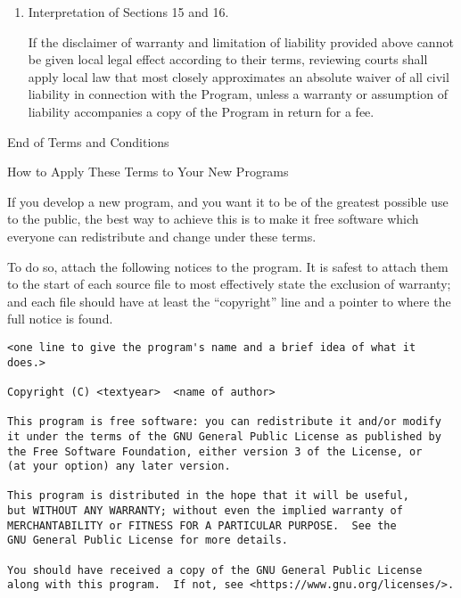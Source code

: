 \begin{enumerate}
        IN NO EVENT UNLESS REQUIRED BY APPLICABLE LAW OR AGREED TO IN
        WRITING WILL ANY COPYRIGHT HOLDER, OR ANY OTHER PARTY WHO MODIFIES
        AND/OR CONVEYS THE PROGRAM AS PERMITTED ABOVE, BE LIABLE TO YOU FOR
        DAMAGES, INCLUDING ANY GENERAL, SPECIAL, INCIDENTAL OR CONSEQUENTIAL
        DAMAGES ARISING OUT OF THE USE OR INABILITY TO USE THE PROGRAM
        (INCLUDING BUT NOT LIMITED TO LOSS OF DATA OR DATA BEING RENDERED
        INACCURATE OR LOSSES SUSTAINED BY YOU OR THIRD PARTIES OR A FAILURE
        OF THE PROGRAM TO OPERATE WITH ANY OTHER PROGRAMS), EVEN IF SUCH
        HOLDER OR OTHER PARTY HAS BEEN ADVISED OF THE POSSIBILITY OF SUCH
        DAMAGES.

  \item Interpretation of Sections 15 and 16.

        If the disclaimer of warranty and limitation of liability provided
        above cannot be given local legal effect according to their terms,
        reviewing courts shall apply local law that most closely approximates
        an absolute waiver of all civil liability in connection with the
        Program, unless a warranty or assumption of liability accompanies a
        copy of the Program in return for a fee.
\end{enumerate}

\begin{center}
  {\Large\sc End of Terms and Conditions}

  \bigskip
  How to Apply These Terms to Your New Programs
\end{center}

If you develop a new program, and you want it to be of the greatest
possible use to the public, the best way to achieve this is to make it
free software which everyone can redistribute and change under these terms.

To do so, attach the following notices to the program.  It is safest
to attach them to the start of each source file to most effectively
state the exclusion of warranty; and each file should have at least
the ``copyright'' line and a pointer to where the full notice is found.

  {\footnotesize
    \begin{verbatim}
<one line to give the program's name and a brief idea of what it does.>

Copyright (C) <textyear>  <name of author>

This program is free software: you can redistribute it and/or modify
it under the terms of the GNU General Public License as published by
the Free Software Foundation, either version 3 of the License, or
(at your option) any later version.

This program is distributed in the hope that it will be useful,
but WITHOUT ANY WARRANTY; without even the implied warranty of
MERCHANTABILITY or FITNESS FOR A PARTICULAR PURPOSE.  See the
GNU General Public License for more details.

You should have received a copy of the GNU General Public License
along with this program.  If not, see <https://www.gnu.org/licenses/>.
\end{verbatim}
  }


